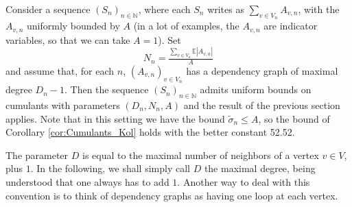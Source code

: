 \documentclass[envcountsame]{svmult}
\newcommand{\N}{\mathbb{N}}
\newcommand{\esper}{\mathbb{E}}
\begin{document}
Consider a sequence $(S_n)_{n \in \N}$, where each $S_n$ writes as $\sum_{v \in V_n} A_{v,n}$,
with the $A_{v,n}$ uniformly bounded by $A$ (in a lot of examples, the $A_{v,n}$ are indicator variables,
so that we can take $A=1$). Set $$N_n=\tfrac{\sum_{v\in V_n} \esper|A_{v,n}|}{A}$$ 
and assume that, for each $n$, $(A_{v,n})_{v \in V_n}$ has a dependency graph of maximal degree $D_n-1$.
Then the sequence $(S_n)_{n \in \N}$ admits uniform bounds on cumulants with parameters $(D_n,N_n,A)$
and the result of the previous section applies. Note that in this setting we have the bound $\widetilde{\sigma}_n\leq A$, so the bound of Corollary \ref{cor:Cumulants_Kol} holds with the better constant 52.52.


\begin{remark}
The parameter $D$ is equal to the maximal number of neighbors of a vertex $v \in V$, plus $1$. In the following, we shall simply call $D$ the maximal degree, being understood that one always has to add $1$. Another way to deal with this convention is to think of dependency graphs as having one loop at each vertex.
\end{remark}
\end{document}
